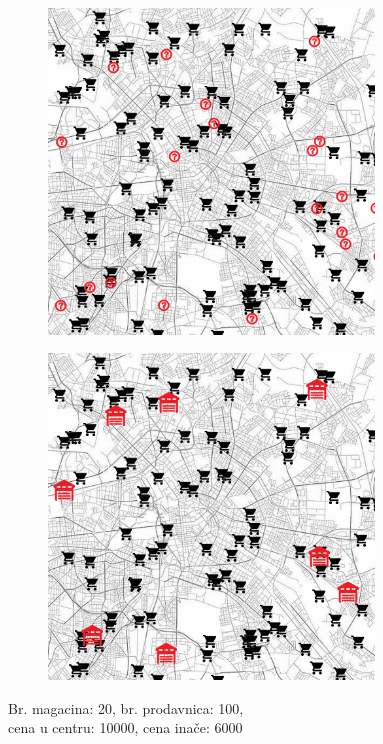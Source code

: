 \documentclass[a4paper]{article}
\begin{document}
\begin{figure}[H]
\centering
\begin{subfigure}{.5\textwidth}
    \centering
    \includegraphics[width=0.95\textwidth]{pics/candidates3.png}
\end{subfigure}%
\begin{subfigure}{.5\textwidth}
    \centering
    \includegraphics[width=0.95\textwidth]{pics/final3.png}
\end{subfigure}
\caption[long]{Br. magacina: 20, br. prodavnica: 100,\\ cena u centru: 10000, cena inače: 6000}
\end{figure}
\end{document}
